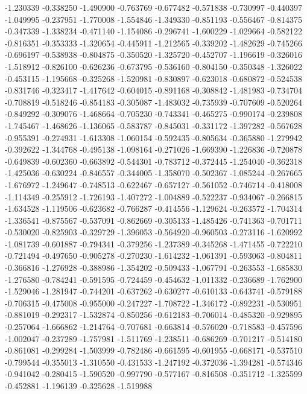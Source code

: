 -1.230339
-0.338250
-1.490900
-0.763769
-0.677482
-0.571838
-0.730997
-0.440397
-1.049995
-0.237951
-1.770008
-1.554846
-1.349330
-0.851193
-0.556467
-0.814375
-0.347339
-1.338234
-0.471140
-1.154086
-0.296741
-1.600229
-1.029664
-0.582122
-0.816351
-0.353333
-1.320654
-0.445911
-1.212565
-0.339202
-1.482629
-0.745266
-0.696197
-0.538938
-0.804875
-0.350520
-1.325720
-0.452707
-1.196619
-0.326016
-1.518912
-0.826100
-0.626236
-0.673795
-0.536160
-0.804150
-0.350348
-1.326022
-0.453115
-1.195668
-0.325268
-1.520981
-0.830897
-0.623018
-0.680872
-0.524538
-0.831746
-0.323417
-1.417642
-0.604015
-0.891168
-0.308842
-1.481983
-0.734704
-0.708819
-0.518246
-0.854183
-0.305087
-1.483032
-0.735939
-0.707609
-0.520264
-0.849292
-0.309076
-1.468664
-0.705230
-0.743341
-0.465275
-0.990174
-0.239808
-1.745467
-1.468626
-1.136065
-0.583787
-0.845031
-0.331172
-1.397282
-0.567628
-0.955391
-0.274931
-1.613308
-1.060154
-0.592435
-0.805634
-0.365880
-1.279942
-0.392622
-1.344768
-0.495138
-1.098164
-0.271026
-1.669390
-1.226836
-0.720878
-0.649839
-0.602360
-0.663892
-0.544301
-0.783712
-0.372445
-1.254040
-0.362318
-1.425036
-0.630224
-0.846557
-0.344005
-1.358070
-0.502367
-1.085244
-0.267665
-1.676972
-1.249647
-0.748513
-0.622467
-0.657127
-0.561052
-0.746714
-0.418008
-1.114349
-0.255912
-1.726193
-1.407272
-1.004889
-0.522237
-0.934067
-0.266815
-1.634528
-1.119506
-0.623682
-0.766287
-0.414556
-1.129624
-0.263572
-1.704314
-1.336541
-0.875567
-0.537091
-0.862669
-0.305133
-1.485426
-0.741363
-0.701711
-0.530020
-0.825903
-0.329729
-1.396053
-0.564920
-0.960503
-0.273116
-1.620992
-1.081739
-0.601887
-0.794341
-0.379256
-1.237389
-0.345268
-1.471455
-0.722210
-0.721494
-0.497650
-0.905278
-0.270230
-1.614232
-1.061391
-0.593063
-0.804811
-0.366816
-1.276928
-0.388986
-1.354202
-0.509433
-1.067791
-0.263553
-1.685830
-1.276580
-0.784241
-0.591595
-0.724459
-0.454632
-1.011332
-0.236689
-1.762900
-1.529046
-1.281947
-0.744201
-0.637262
-0.630277
-0.610133
-0.643741
-0.579188
-0.706315
-0.475008
-0.955000
-0.247227
-1.708722
-1.346172
-0.892231
-0.530951
-0.881019
-0.292317
-1.532874
-0.850256
-0.612183
-0.706014
-0.485320
-0.929895
-0.257064
-1.666862
-1.214764
-0.707681
-0.663814
-0.576020
-0.718583
-0.457596
-1.002047
-0.237289
-1.757981
-1.511769
-1.238511
-0.686269
-0.701217
-0.514180
-0.861081
-0.299284
-1.503999
-0.782486
-0.661595
-0.601955
-0.668171
-0.537510
-0.799544
-0.355013
-1.310550
-0.431533
-1.247192
-0.372036
-1.394281
-0.574346
-0.941042
-0.280415
-1.590520
-0.997790
-0.577167
-0.816508
-0.351712
-1.325599
-0.452881
-1.196139
-0.325628
-1.519988
